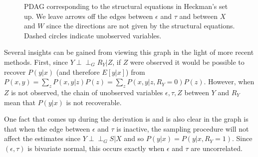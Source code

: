 \documentclass[12pt,twoside]{reedthesis}
\theoremstyle{definition}
\newcommand{\dsep}{\perp \!\!\!\perp}
\begin{document}
\begin{figure}[H]
\begin{center}
\end{center}
\caption{PDAG corresponding to the structural equations in Heckman's set up. We leave arrows off the edges between $\epsilon$ and $\tau$ and between $X$ and $W$ since the directions are not given by the structural equations. Dashed circles indicate unobserved variables.}
\end{figure}

Several insights can be gained from viewing this graph in the light of more recent methods. First, since $Y \dsep_G R_Y | Z$, if $Z$ were observed it would be possible to recover $P(y | x)$ (and therefore $E[y | x]$) from $P(x,y) = \sum_z P(x,y | z)P(z) = \sum_z P(x,y | z, R_Y = 0)P(z)$. However, when $Z$ is not observed, the chain of unobserved variables $\epsilon, \tau, Z$ between $Y$ and $R_Y$ mean that $P(y | x)$ is not recoverable.

One fact that comes up during the derivation is and is also clear in the graph is that when the edge between $\epsilon$ and $\tau$ is inactive, the sampling procedure will not affect the estimates since  $Y \dsep_G S | X$ and so $P(y| x) = P(y|x, R_Y = 1)$. Since $(\epsilon, \tau)$ is bivariate normal, this occurs exactly when $\epsilon$ and $\tau$ are uncorrelated. 
\end{document}
